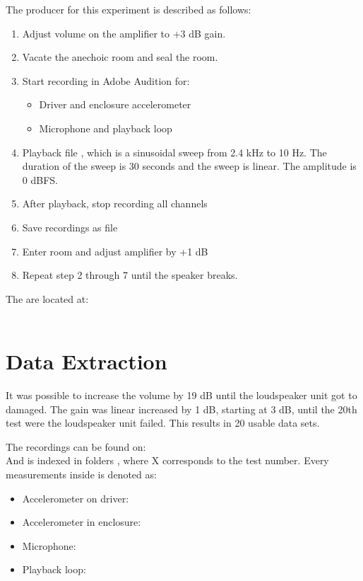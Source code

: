 The producer for this experiment is described as follows:
\vspace{-5mm}
\begin{enumerate}
\item Adjust volume on the amplifier to +3 dB gain.
\item Vacate the anechoic room and seal the room.
\item Start recording in Adobe Audition for:
\begin{itemize}
\item Driver and enclosure accelerometer
\item Microphone and playback loop
\end{itemize}
\item Playback file , which is a sinusoidal sweep from 2.4 kHz to 10 Hz. The duration of the sweep is 30 seconds and the sweep is linear. The amplitude is 0 dBFS.
\item After playback, stop recording all channels
\item Save recordings as  file
\item Enter room and adjust amplifier by +1 dB
\item Repeat step 2 through 7 until the speaker breaks.
\end{enumerate}

The  are located at:\\
\\


%



\section{Data Extraction}


It was possible to increase the volume by 19 dB until the loudspeaker unit got to damaged. The gain was linear increased by 1 dB, starting at 3 dB, until the 20th test were the loudspeaker unit failed. This results in 20 usable data sets.

The recordings can be found on:\\
And is indexed in folders , where X corresponds to the test number. Every measurements inside is denoted as:
\begin{itemize}
\item Accelerometer on driver: 
\item Accelerometer in enclosure: 
\item Microphone: 
\item Playback loop: 
\end{itemize}

